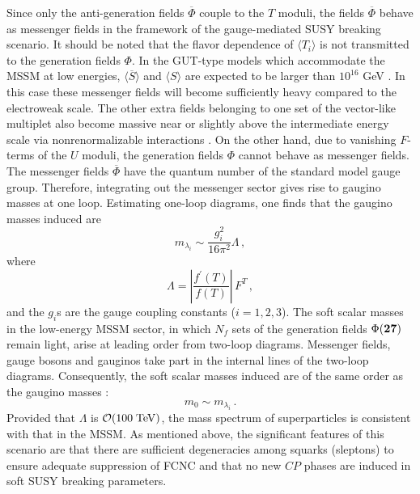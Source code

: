 Since only the anti-generation fields 
${\overline \Phi}$ couple to the $T$ moduli, 
the fields ${\overline \Phi}$ behave as messenger fields 
in the framework of the gauge-mediated SUSY breaking scenario.
It should be noted that the flavor dependence of $\langle T_{i} \rangle$ 
is not transmitted to the generation fields $\Phi$.
In the GUT-type models which accommodate the MSSM at low energies, 
$\langle \overline{S} \rangle$ and 
$\langle S \rangle$ are expected to be larger than $10^{16}$ GeV
\cite{E6}. 
In this case these messenger fields will become sufficiently heavy 
compared to the electroweak scale. 
The other extra fields belonging to one set of the vector-like multiplet 
also become massive near or slightly above the intermediate energy scale 
via nonrenormalizable interactions \cite{E6}. 
On the other hand, due to vanishing $F$-terms of the $U$ moduli, 
the generation fields $\Phi$ cannot behave as messenger fields. 
The messenger fields ${\overline \Phi}$ have 
the quantum number of the standard model gauge group. 
Therefore, integrating out the messenger sector gives rise to 
gaugino masses at one loop. 
Estimating one-loop diagrams, one finds that the gaugino masses induced are
\begin{equation}
    m_{\lambda_i} \sim \frac{g^{2}_{i}}{16\pi^{2}}\Lambda \,, 
\label{eqn7}
\end{equation}
where 
\begin{equation}
   \Lambda = \left| \frac {f^{\prime}(T)}{f(T)} \right| \,F^{T}\,, 
\label{eqn8}
\end{equation}
and the $g_{i}$s are the gauge coupling constants ($i=1,2,3$). 
The soft scalar masses in the low-energy MSSM sector, 
in which $N_f$ sets of the generation fields $\Phi({\bf 27})$ 
remain light, 
arise at leading order from two-loop diagrams. 
Messenger fields, gauge bosons and gauginos take part 
in the internal lines of the two-loop diagrams. 
Consequently, the soft scalar masses induced are of the same order 
as the gaugino masses :
\begin{equation}
    m_{0} \sim m_{\lambda_i}\,. 
\label{eqn9}
\end{equation}
Provided that $\Lambda$ is $ {\cal O}(100\;{\rm TeV})$, 
the mass spectrum of superparticles is consistent with that in the MSSM. 
As mentioned above, the significant features of this scenario 
are that there are sufficient degeneracies among squarks (sleptons) 
to ensure adequate suppression of FCNC 
and that no new $CP$ phases are induced in soft SUSY breaking 
parameters. 


